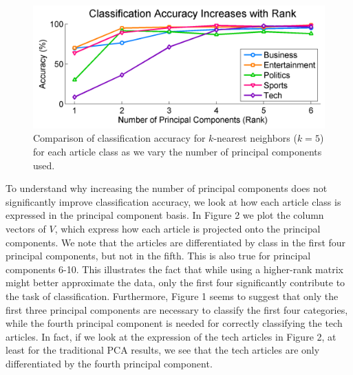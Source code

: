 \documentclass[12pt]{article}
\begin{document}
\begin{figure}[H]
\centering
\includegraphics[width=.6\textwidth]{figures/accuracybyrank}
\caption{Comparison of classification accuracy for $k$-nearest neighbors ($k = 5$) for each article class as we vary the number of principal components used.}
\label{class_accuracy}
\end{figure}

To understand why increasing the number of principal components does not significantly improve classification accuracy, we look at how each article class is expressed in the principal component basis. In Figure 2 we plot the column vectors of $V$, which express how each article is projected onto the principal components. We note that the articles are differentiated by class in the first four principal components, but not in the fifth. This is also true for principal components 6-10. This illustrates the fact that while using a higher-rank matrix might better approximate the data, only the first four significantly contribute to the task of classification. Furthermore, Figure 1 seems to suggest that only the first three principal components are necessary to classify the first four categories, while the fourth principal component is needed for correctly classifying the tech articles. In fact, if we look at the expression of the tech articles in Figure 2, at least for the traditional PCA results, we see that the tech articles are only differentiated by the fourth principal component. 
\end{document}

